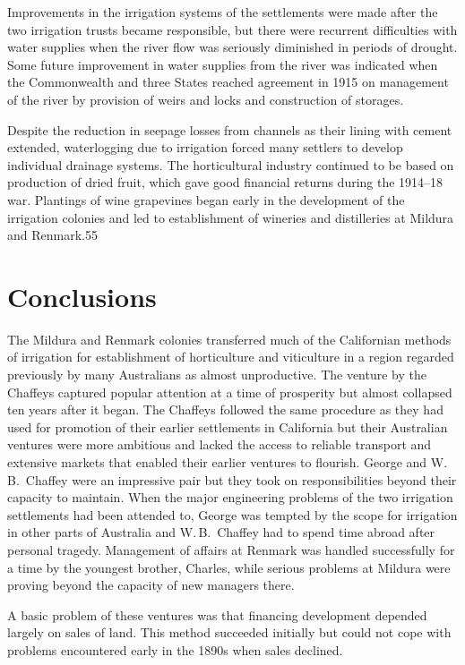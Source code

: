 Improvements in the irrigation systems of the settlements were made
after the two irrigation trusts became responsible, but there were
recurrent difficulties with water supplies when the river flow was
seriously diminished in periods of drought.  Some future improvement
in water supplies from the river was indicated when the Commonwealth
and three States reached agreement in 1915 on management of the river
by provision of weirs and locks and construction of storages.

Despite the reduction in seepage losses from channels as their lining
with cement extended, waterlogging due to irrigation forced many
settlers to develop individual drainage systems.  The horticultural
industry continued to be based on production of dried fruit, which
gave good financial returns during the 1914--18 war.  Plantings of
wine grapevines began early in the development of the irrigation
colonies and led to establishment of wineries and distilleries at
Mildura and Renmark.55

\section{Conclusions}

The Mildura and Renmark colonies transferred much of the Californian
methods of irrigation for establishment of horticulture and
viticulture in a region regarded previously by many Australians as
almost unproductive.  The venture by the Chaffeys captured popular
attention at a time of prosperity but almost collapsed ten years after
it began.  The Chaffeys followed the same procedure as they had used
for promotion of their earlier settlements in California but their
Australian ventures were more ambitious and lacked the access to
reliable transport and extensive markets that enabled their earlier
ventures to flourish.  George and W.\,B.~Chaffey were an impressive
pair but they took on responsibilities beyond their capacity to
maintain.  When the major engineering problems of the two irrigation
settlements had been attended to, George was tempted by the scope for
irrigation in other parts of Australia and W.\,B.~Chaffey had to spend
time abroad after personal tragedy.  Management of affairs at Renmark
was handled successfully for a time by the youngest brother, Charles,
while serious problems at Mildura were proving beyond the capacity of
new managers there.

A basic problem of these ventures was that financing development
depended largely on sales of land.  This method succeeded initially
but could not cope with problems encountered early in the 1890s when
sales declined.

